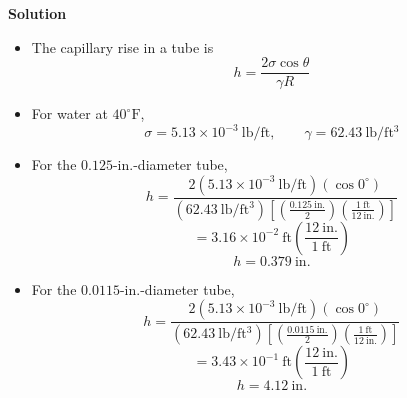 ﻿\documentclass[12pt]{article}
\begin{document}
\textbf{Solution}
\begin{itemize}
\item The capillary rise in a tube is
\[
h=\frac{2\sigma\cos\theta}{\gamma R}
\]
\item For water at $40^\circ\mathrm{F}$,
\[
\sigma=5.13\times10^{-3}\ \mathrm{lb/ft},\qquad \gamma=62.43\ \mathrm{lb/ft^3}
\]
\item[(a)] For the $0.125$-in.-diameter tube,
\[
h=\frac{2\left(5.13\times10^{-3}\ \mathrm{lb/ft}\right)(\cos0^\circ)}{\left(62.43\ \mathrm{lb/ft^3}\right)\left[\left(\frac{0.125\ \mathrm{in.}}{2}\right)\left(\frac{1\ \mathrm{ft}}{12\ \mathrm{in.}}\right)\right]}
\]
\[
=3.16\times10^{-2}\ \mathrm{ft}\left(\frac{12\ \mathrm{in.}}{1\ \mathrm{ft}}\right)
\]
\[
\boxed{h=0.379\ \mathrm{in.}}
\]
\item[(b)] For the $0.0115$-in.-diameter tube,
\[
h=\frac{2\left(5.13\times10^{-3}\ \mathrm{lb/ft}\right)(\cos0^\circ)}{\left(62.43\ \mathrm{lb/ft^3}\right)\left[\left(\frac{0.0115\ \mathrm{in.}}{2}\right)\left(\frac{1\ \mathrm{ft}}{12\ \mathrm{in.}}\right)\right]}
\]
\[
=3.43\times10^{-1}\ \mathrm{ft}\left(\frac{12\ \mathrm{in.}}{1\ \mathrm{ft}}\right)
\]
\[
\boxed{h=4.12\ \mathrm{in.}}
\]
\end{itemize}
\end{document}
